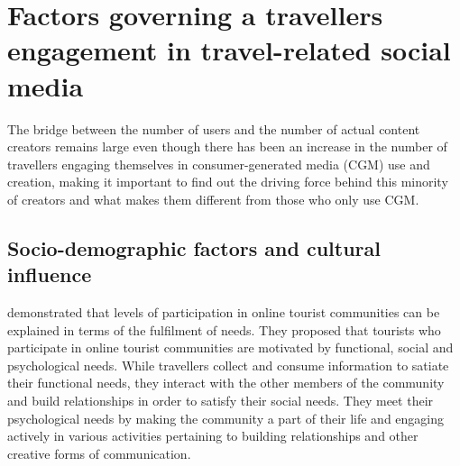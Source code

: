 		


\section{Factors governing a traveller\textquotesingle s engagement in travel-related social media}\label{2}
The bridge between the number of users and the number of actual content creators remains large even though there has been an increase in the number of travellers engaging themselves in consumer-generated media (CGM) use and creation, making it important to find out the driving force behind this minority of creators and what makes them different from those who only use CGM. \cite{yoo2011influence} 

\subsection{Socio-demographic factors and cultural influence}

 

 
\cite{wang2002defining} demonstrated that levels of participation in online tourist communities can be explained in terms of the fulfilment of needs. They proposed that tourists who participate in online tourist communities are motivated by functional, social and psychological needs. While travellers collect and consume information to satiate their functional needs, they interact with the other members of the community and build relationships in order to satisfy their social needs. They meet their psychological needs by making the community a part of their life and engaging actively in various activities pertaining to building relationships and other creative forms of communication.

